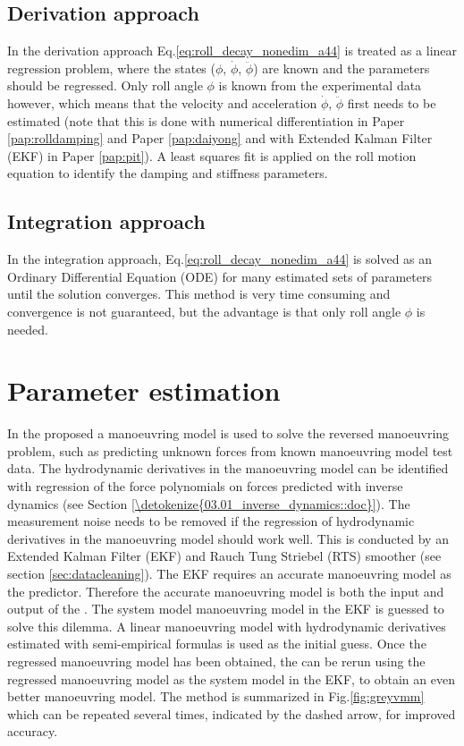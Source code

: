 \subsection{Derivation approach}\label{sec:derivation_approach}
In the derivation approach Eq.\ref{eq:roll_decay_nonedim_a44} is treated as a linear regression problem, where the states ($\phi$, $\dot{\phi}$, $\ddot{\phi}$) are known and the parameters should be regressed. Only roll angle $\phi$ is known from the experimental data however, which means that the velocity and acceleration $\dot{\phi}$, $\ddot{\phi}$ first needs to be estimated (note that this is done with numerical differentiation in Paper \ref{pap:rolldamping} and Paper \ref{pap:daiyong} and with Extended Kalman Filter (EKF) in Paper \ref{pap:pit}).
A least squares fit is applied on the roll motion equation to identify the damping and stiffness parameters.

\subsection{Integration approach}\label{sec:integration_approach}
In the integration approach, Eq.\ref{eq:roll_decay_nonedim_a44} is solved as an Ordinary Differential Equation (ODE) for many estimated sets of parameters until the solution converges. This method is very time consuming and convergence is not guaranteed, but the advantage is that only roll angle $\phi$ is needed.

\section{Parameter estimation} \label{sec:_VMM}
In the proposed  a manoeuvring model is used to solve the reversed manoeuvring problem, such as predicting unknown forces from known manoeuvring model test data. The hydrodynamic derivatives in the manoeuvring model can be identified with regression of the force polynomials on forces predicted with inverse dynamics (see Section \ref{\detokenize{03.01_inverse_dynamics::doc}}).
The measurement noise needs to be removed if the regression of hydrodynamic derivatives in the manoeuvring model should work well. This is conducted by an Extended Kalman Filter (EKF) and Rauch Tung Striebel (RTS) smoother (see section \ref{sec:datacleaning}). The EKF requires an accurate manoeuvring model as the predictor.
Therefore the accurate manoeuvring model is both the input and output of the . The system model manoeuvring model in the EKF is guessed to solve this dilemma. A linear manoeuvring model with hydrodynamic derivatives estimated with semi-empirical formulas is used as the initial guess. Once the regressed manoeuvring model has been obtained, the  can be rerun using the regressed manoeuvring model as the system model in the EKF, to obtain an even better manoeuvring model. The method is summarized in Fig.\ref{fig:greyvmm} which can be repeated several times, indicated by the dashed arrow, for improved accuracy. 

